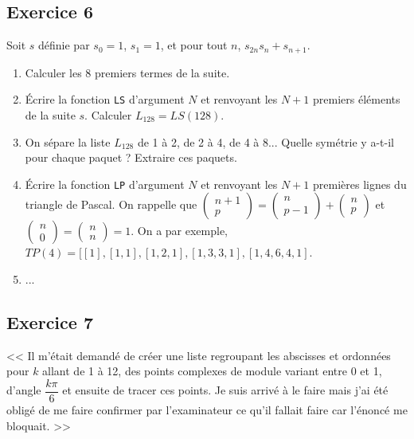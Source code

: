 \documentclass[10pt,fleqn]{article} %
\begin{document}
\begin{multicols}{2}
\subsection*{Exercice 6}
Soit $s$ définie par $s_0=1$,  $s_1=1$, et pour tout $n$, $s_{2n}s_n+s_{n+1}$. 
\begin{enumerate}
\item Calculer les 8 premiers termes de la suite.
\item Écrire la fonction \texttt{LS} d'argument $N$ et renvoyant les $N+1$ premiers éléments de la suite $s$. Calculer $L_{128}=LS(128)$. 
\item On sépare la liste $L_{128}$ de 1 à 2, de 2 à 4, de 4 à 8... Quelle symétrie y a-t-il pour chaque paquet ? Extraire ces paquets.
\item Écrire la fonction \texttt{LP} d'argument $N$ et renvoyant les $N+1$ premières lignes du triangle de Pascal. On rappelle que $\begin{pmatrix}n+1 \\ p \end{pmatrix}=\begin{pmatrix}n \\ p-1 \end{pmatrix}+\begin{pmatrix}n \\ p \end{pmatrix}$ et $\begin{pmatrix}n \\ 0 \end{pmatrix} = \begin{pmatrix}n \\ n \end{pmatrix}=1$.
On a par exemple, $TP(4)=[[1],[1,1],[1,2,1],[1,3,3,1],[1,4,6,4,1]$.
\item ...
\end{enumerate} 


\subsection*{Exercice 7}
<< Il m'était demandé de créer une liste regroupant les abscisses et ordonnées pour $k$ allant de 1 à 12, des points complexes de module variant entre 0 et 1, d'angle $\dfrac{k\pi}{6}$ et ensuite de tracer ces points. Je suis arrivé à le faire mais j'ai été obligé de me faire confirmer par l'examinateur ce qu'il fallait faire car l'énoncé me bloquait.
>>


\end{multicols}
\end{document}
